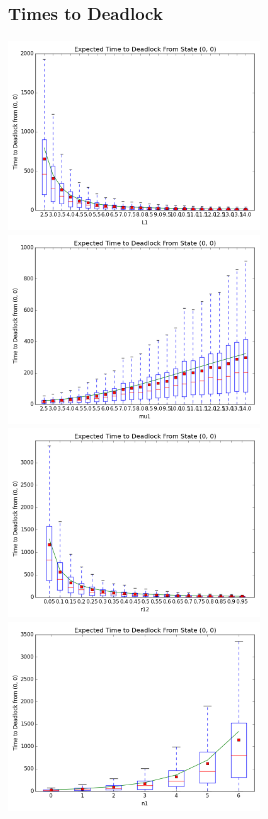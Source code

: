 \documentclass{beamer}
\begin{document}
\begin{frame}
    \begin{figure}
    
    \end{figure}
\end{frame}

\begin{frame}
    \frametitle{Times to Deadlock}
    \includegraphics[width=0.5\textwidth]{varyL1}
    \includegraphics[width=0.5\textwidth]{varymu1}\newline
    \includegraphics[width=0.5\textwidth]{varyr12}
    \includegraphics[width=0.5\textwidth]{varyn1}
\end{frame}
\end{document}
